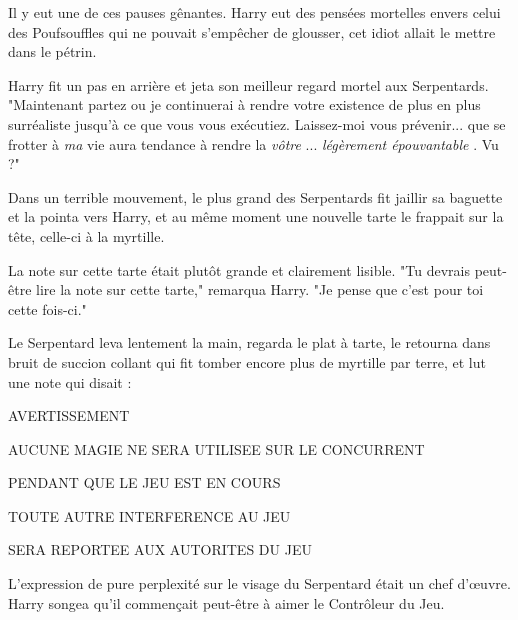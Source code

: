 Il y eut une de ces pauses gênantes. Harry eut des pensées mortelles envers celui des Poufsouffles qui ne pouvait s'empêcher de glousser, cet idiot allait le mettre dans le pétrin.

Harry fit un pas en arrière et jeta son meilleur regard mortel aux Serpentards. "Maintenant partez ou je continuerai à rendre votre existence de plus en plus surréaliste jusqu'à ce que vous vous exécutiez. Laissez-moi vous prévenir... que se frotter à \emph{ma}  vie aura tendance à rendre la \emph{vôtre} ... \emph{légèrement épouvantable} . Vu ?"

Dans un terrible mouvement, le plus grand des Serpentards fit jaillir sa baguette et la pointa vers Harry, et au même moment une nouvelle tarte le frappait sur la tête, celle-ci à la myrtille.

La note sur cette tarte était plutôt grande et clairement lisible. "Tu devrais peut-être lire la note sur cette tarte," remarqua Harry. "Je pense que c'est pour toi cette fois-ci."

Le Serpentard leva lentement la main, regarda le plat à tarte, le retourna dans bruit de succion collant qui fit tomber encore plus de myrtille par terre, et lut une note qui disait :


\begin{center}\MakeUppercase{AVERTISSEMENT}\end{center}



\begin{center}\MakeUppercase{AUCUNE} MAGIE NE SERA UTILISEE SUR LE CONCURRENT\end{center}



\begin{center}PENDANT QUE LE JEU EST EN COURS\end{center}



\begin{center}TOUTE AUTRE INTERFERENCE AU JEU\end{center}



\begin{center}\MakeUppercase{SERA} REPORTEE AUX AUTORITES DU JEU\end{center}


L'expression de pure perplexité sur le visage du Serpentard était un chef d'œuvre. Harry songea qu'il commençait peut-être à aimer le Contrôleur du Jeu.

